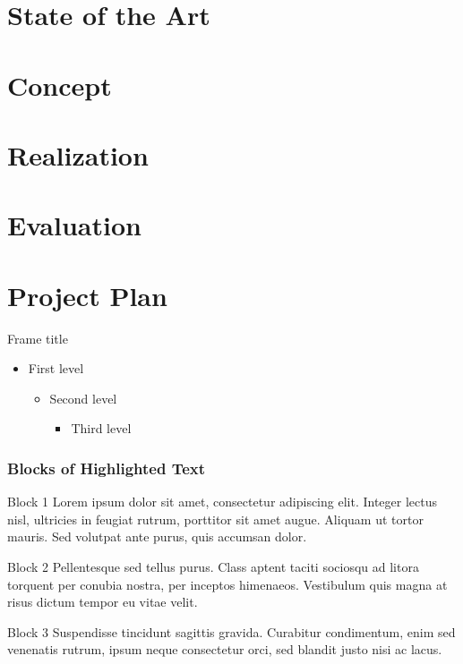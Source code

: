 
\section{State of the Art}
\section{Concept}
\section{Realization}
\section{Evaluation}
\section{Project Plan}
\begin{frame}{Frame title}
  \begin{itemize}
    \item First level
          \begin{itemize}
            \item Second level
                  \begin{itemize}
                    \item Third level
                  \end{itemize}
          \end{itemize}
  \end{itemize}
\end{frame}


\begin{frame}
  \frametitle{Blocks of Highlighted Text}
  \begin{block}{Block 1}
    Lorem ipsum dolor sit amet, consectetur adipiscing elit. Integer lectus nisl, ultricies in feugiat rutrum, porttitor sit amet augue. Aliquam ut tortor mauris. Sed volutpat ante purus, quis accumsan dolor.
  \end{block}

  \begin{block}{Block 2}
    Pellentesque sed tellus purus. Class aptent taciti sociosqu ad litora torquent per conubia nostra, per inceptos himenaeos. Vestibulum quis magna at risus dictum tempor eu vitae velit.
  \end{block}

  \begin{block}{Block 3}
    Suspendisse tincidunt sagittis gravida. Curabitur condimentum, enim sed venenatis rutrum, ipsum neque consectetur orci, sed blandit justo nisi ac lacus.
  \end{block}
\end{frame}

